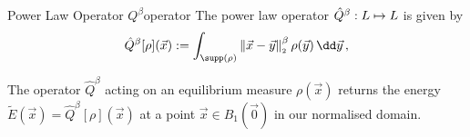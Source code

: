 \begin{definition}{Power Law Operator $Q^\beta$}{operator}
  The power law operator $\hat{Q}^\beta: L \mapsto L$ is given by
  $$\hat{Q}^\beta[\rho](\vec{x}) := \int_{\supp(\rho)} \norm{\vec{x}-\vec{y}}^\beta \rho(\vec{y}) \,\dd\vec{y}\,,$$
\end{definition}

The operator $\hat{Q}^\beta$ acting on an equilibrium measure $\rho(\vec{x})$ returns the energy $\tilde{E}(\vec{x}) = \hat{Q}^\beta[\rho](\vec{x})$ at a point $\vec{x} \in B_1(\vec{0})$ in our normalised domain.
